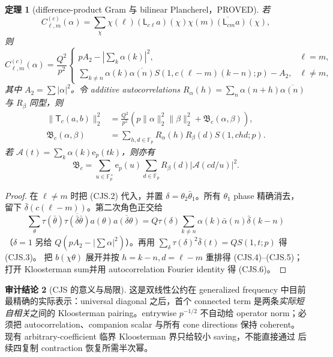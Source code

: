 \documentclass[11pt,a4paper]{ctexart}
\newtheorem{theorem}{定理}[section]
\theoremstyle{definition}
\newtheorem{audit}[theorem]{审计结论}
\newcommand{\e}{\mathrm e}
\newcommand{\1}{\mathbf 1}
\newcommand{\F}{\mathbb F}
\newcommand{\G}{\F_p^\times}
\newcommand{\PROVED}{\textcolor{green!40!black}{\textsf{PROVED}}}
\begin{document}
\begin{theorem}[difference-product Gram 与 bilinear Plancherel，\PROVED]
若
\[
 C_{\ell,m}^{(c)}(\alpha)=\sum_\chi\chi(\ell)(\mathsf L_{c\ell}a)(\chi)
 \overline{\chi(m)(\mathsf L_{cm}a)(\chi)},
\]
则
\[
 C_{\ell,m}^{(c)}(\alpha)=\frac{Q^2}{p^2}
 \begin{cases}
 pA_2-|\sum_k\alpha(k)|^2,&\ell=m,\\[1mm]
 \sum_{k\ne n}\alpha(k)\overline{\alpha(n)}
 S(1,c(\ell-m)(k-n);p)-A_2,&\ell\ne m,
 \end{cases}                                         \tag{CJS.3}
\]
其中 $A_2=\sum|\alpha|^2$。令 additive autocorrelations
$R_\alpha(h)=\sum_n\alpha(n+h)\overline{\alpha(n)}$ 与 $R_\beta$ 同型，则
\begin{align}
 \|\mathsf T_c(a,b)\|_2^2
 &=\frac{Q^2}{p^2}\left(p\|\alpha\|_2^2\|\beta\|_2^2
 +\mathfrak B_c(\alpha,\beta)\right),               \tag{CJS.4}\\
 \mathfrak B_c(\alpha,\beta)
 &=\sum_{h,d\in\F_p}R_\alpha(h)R_\beta(d)S(1,chd;p).\tag{CJS.5}
\end{align}
若 $\mathcal A(t)=\sum_k\alpha(k)\e_p(tk)$，则亦有
\[
 \mathfrak B_c=\sum_{u\in\G}\e_p(u)
 \sum_{d\in\F_p}R_\beta(d)|\mathcal A(cd/u)|^2.    \tag{CJS.6}
\]
\end{theorem}
\begin{proof}
在 $\ell\ne m$ 时把 (CJS.2) 代入，并置
$\delta=\theta_2\bar\theta_1$。所有 $\theta_1$ phase 精确消去，留下
$\bar\delta(c(\ell-m))$。第二次角色正交给
\[
 \sum_\theta\tau(\bar\theta)\overline{\tau(\bar\delta\bar\theta)}
 a(\theta)\overline{a(\delta\theta)}
 =Q\tau(\delta)\sum_{k\ne n}\alpha(k)\bar\alpha(n)\bar\delta(k-n)
\]
（$\delta=1$ 另给 $Q(pA_2-|\sum\alpha|^2)$）。再用
$\sum_\delta\tau(\delta)^2\bar\delta(t)=QS(1,t;p)$ 得 (CJS.3)。
把 $b(\chi\theta)$ 展开并按 $h=k-n,d=\ell-m$ 重排得 (CJS.4)--(CJS.5)；
打开 Kloosterman sum并用 autocorrelation Fourier identity 得 (CJS.6)。
\end{proof}

\begin{audit}[CJS 的意义与局限]
这是双线性公约在 generalized frequency 中目前最精确的实际表示：universal
diagonal 之后，首个 connected term 是两条\emph{实际短自相关}之间的
Kloosterman pairing。entrywise $p^{-1/2}$ 不自动给 operator norm；必须把
autocorrelation、companion scalar 与所有 cone directions 保持 coherent。
现有 arbitrary-coefficient 临界 Kloosterman 界只给较小 saving，不能直接通过
后续四复制 contraction 恢复所需半次幂。
\end{audit}
\end{document}
